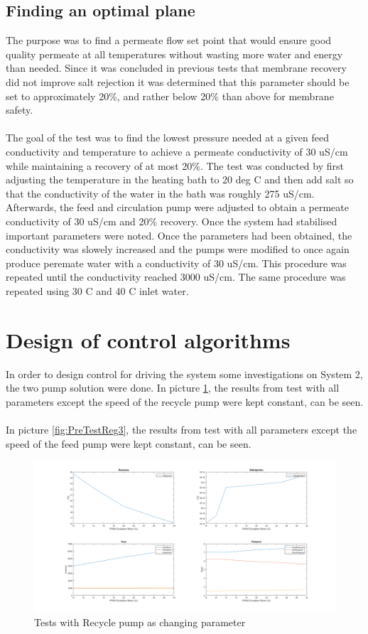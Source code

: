 \subsection{Finding an optimal plane}

The purpose was to find a permeate flow set point that would ensure good quality permeate at all temperatures without wasting more water and energy than needed. Since it was concluded in previous tests that membrane recovery did not improve salt rejection it was determined that this parameter should be set to approximately 20\%, and rather below 20\% than above for membrane safety. \\
\\
The goal of the test was to find the lowest pressure needed at a given feed conductivity and temperature to achieve a permeate conductivity of 30 uS/cm while maintaining a recovery of at most 20\%. The test was conducted by first adjusting the temperature in the heating bath to 20 deg C and then add salt so that the conductivity of the water in the bath was roughly 275 uS/cm. Afterwards, the feed and circulation pump were adjusted to obtain a  permeate conductivity of 30 uS/cm and 20\% recovery. Once the system had stabilised important parameters were noted. Once the parameters had been obtained, the conductivity was slowely increased and the pumps were modified to once again produce peremate water with a conductivity of 30 uS/cm. This procedure was repeated until the conductivity reached 3000 uS/cm. The same procedure was repeated using 30 C and 40 C inlet water.


\section{Design of control algorithms}
In order to design control for driving the system some investigations on System 2, the two pump solution were done. In picture \ref{fig:PreTestReg1}, the results from test with all parameters except the speed of the recycle pump were kept constant, can be seen. \\
\\
In picture \ref{fig:PreTestReg3}, the results from test with all parameters except the speed of the feed pump were kept constant, can be seen.

\begin{figure}[h]
    \centering
    \includegraphics[width=1.65\textwidth, angle = 270]{PreTestReg1.png}
    \caption{Tests with Recycle pump as changing parameter}
    \label{fig:PreTestReg1}
\end{figure}

